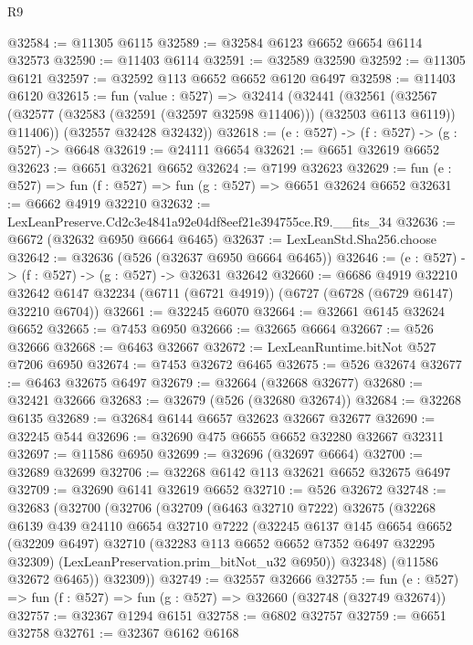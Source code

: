 \begin{lexlean}{R9}
\begin{coremodule}
@32584 := @11305 @6115
@32589 := @32584 @6123 @6652 @6654 @6114 @32573
@32590 := @11403 @6114
@32591 := @32589 @32590
@32592 := @11305 @6121
@32597 := @32592 @113 @6652 @6652 @6120 @6497
@32598 := @11403 @6120
@32615 := fun (value : @527) =>
  @32414
    (@32441
      (@32561
        (@32567 (@32577 (@32583 (@32591 (@32597 @32598 @11406))) (@32503 @6113 @6119)) @11406))
      (@32557 @32428 @32432))
@32618 := (e : @527) -> (f : @527) -> (g : @527) -> @6648
@32619 := @24111 @6654
@32621 := @6651 @32619 @6652
@32623 := @6651 @32621 @6652
@32624 := @7199 @32623
@32629 := fun (e : @527) => fun (f : @527) => fun (g : @527) => @6651 @32624 @6652
@32631 := @6662 @4919 @32210
@32632 := LexLeanPreserve.Cd2c3e4841a92e04df8eef21e394755ce.R9.__fits_34
@32636 := @6672 (@32632 @6950 @6664 @6465)
@32637 := LexLeanStd.Sha256.choose
@32642 := @32636 (@526 (@32637 @6950 @6664 @6465))
@32646 := (e : @527) -> (f : @527) -> (g : @527) -> @32631 @32642
@32660 := @6686
    @4919
    @32210
    @32642
    @6147
    @32234
    (@6711 (@6721 @4919))
    (@6727 (@6728 (@6729 @6147) @32210 @6704))
@32661 := @32245 @6070
@32664 := @32661 @6145 @32624 @6652
@32665 := @7453 @6950
@32666 := @32665 @6664
@32667 := @526 @32666
@32668 := @6463 @32667
@32672 := LexLeanRuntime.bitNot @527 @7206 @6950
@32674 := @7453 @32672 @6465
@32675 := @526 @32674
@32677 := @6463 @32675 @6497
@32679 := @32664 (@32668 @32677)
@32680 := @32421 @32666
@32683 := @32679 (@526 (@32680 @32674))
@32684 := @32268 @6135
@32689 := @32684 @6144 @6657 @32623 @32667 @32677
@32690 := @32245 @544
@32696 := @32690 @475 @6655 @6652 @32280 @32667 @32311
@32697 := @11586 @6950
@32699 := @32696 (@32697 @6664)
@32700 := @32689 @32699
@32706 := @32268 @6142 @113 @32621 @6652 @32675 @6497
@32709 := @32690 @6141 @32619 @6652
@32710 := @526 @32672
@32748 := @32683
    (@32700
      (@32706
        (@32709
          (@6463 @32710 @7222)
          @32675
          (@32268
            @6139
            @439
            @24110
            @6654
            @32710
            @7222
            (@32245
              @6137
              @145
              @6654
              @6652
              (@32209 @6497)
              @32710
              (@32283 @113 @6652 @6652 @7352 @6497 @32295 @32309)
              (LexLeanPreservation.prim_bitNot_u32 @6950))
            @32348)
          (@11586 @32672 @6465))
        @32309))
@32749 := @32557 @32666
@32755 := fun (e : @527) => fun (f : @527) => fun (g : @527) => @32660 (@32748 (@32749 @32674))
@32757 := @32367 @1294 @6151
@32758 := @6802 @32757
@32759 := @6651 @32758
@32761 := @32367 @6162 @6168

\end{coremodule}
\end{lexlean}
